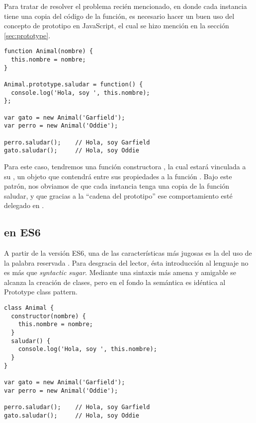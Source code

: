 Para tratar de resolver el problema recién mencionado, en donde cada instancia tiene una copia del código de la función, es necesario hacer un buen uso del concepto de prototipo en JavaScript, el cual se hizo mención en la sección \ref{sec:prototype}.

\begin{lstlisting}[title={Prototype class pattern}]
function Animal(nombre) {
  this.nombre = nombre;
}

Animal.prototype.saludar = function() {
  console.log('Hola, soy ', this.nombre);
};

var gato = new Animal('Garfield');
var perro = new Animal('Oddie');

perro.saludar(); 	// Hola, soy Garfield
gato.saludar(); 	// Hola, soy Oddie
\end{lstlisting}

Para este caso, tendremos una función constructora , la cual estará vinculada a su \code{[[Prototype]]}, un objeto que contendrá entre sus propiedades a la función . Bajo este patrón, nos obviamos de que cada instancia tenga una copia de la función saludar, y que gracias a la "`cadena del prototipo"' ese comportamiento esté delegado en .

\subsection{ en ES6}
\label{clasesenes6}

A partir de la versión ES6, una de las características más jugosas es la del uso de la palabra reservada . Para desgracia del lector, ésta introducción al lenguaje no es más que \textit{syntactic sugar}. Mediante una sintaxis más amena y amigable se alcanza la creación de clases, pero en el fondo la semántica es idéntica al Prototype class pattern.

\begin{lstlisting}[title={Ejemplo de \code{class}}]
class Animal {
  constructor(nombre) {
    this.nombre = nombre;
  }
  saludar() {
    console.log('Hola, soy ', this.nombre);
  }
}

var gato = new Animal('Garfield');
var perro = new Animal('Oddie');

perro.saludar(); 	// Hola, soy Garfield
gato.saludar(); 	// Hola, soy Oddie
\end{lstlisting}
